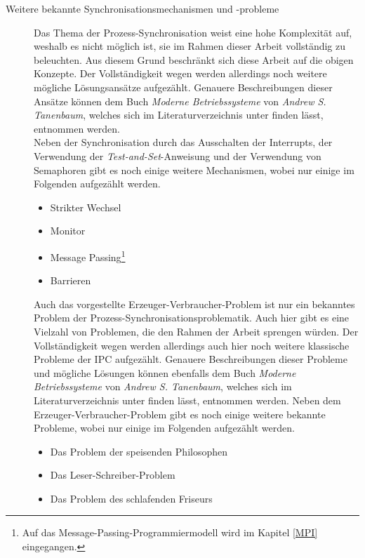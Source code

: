 \begin{description}
					\item[Weitere bekannte Synchronisationsmechanismen und -probleme]
					
						Das Thema der Prozess-Synchronisation weist eine hohe Komplexität auf, weshalb es nicht möglich ist, sie im Rahmen dieser Arbeit vollständig zu beleuchten. Aus diesem Grund beschränkt sich diese Arbeit auf die obigen Konzepte. Der Vollständigkeit wegen werden allerdings noch weitere mögliche Lösungsansätze aufgezählt. Genauere Beschreibungen dieser Ansätze können dem Buch \textit{Moderne Betriebssysteme} von \textit{Andrew S. Tanenbaum}, welches sich im Literaturverzeichnis unter \cite{ModerneBetriebssysteme} finden lässt, entnommen werden.\\
						Neben der Synchronisation durch das Ausschalten der Interrupts, der Verwendung der \textit{Test-and-Set}-Anweisung und der Verwendung von Semaphoren gibt es noch einige weitere Mechanismen, wobei nur einige im Folgenden aufgezählt werden. \cite{ModerneBetriebssysteme}
						
						\begin{itemize}
							\item Strikter Wechsel
							\item Monitor
							\item Message Passing\footnote{Auf das Message-Passing-Programmiermodell wird im Kapitel \ref{MPI} eingegangen.}
							\item Barrieren \cite{ModerneBetriebssysteme}
						\end{itemize}
					
						Auch das vorgestellte Erzeuger-Verbraucher-Problem ist nur ein bekanntes Problem der Prozess-Synchronisationsproblematik. Auch hier gibt es eine Vielzahl von Problemen, die den Rahmen der Arbeit sprengen würden. Der Vollständigkeit wegen werden allerdings auch hier noch weitere klassische Probleme der IPC aufgezählt. Genauere Beschreibungen dieser Probleme und mögliche Lösungen können ebenfalls dem Buch \textit{Moderne Betriebssysteme} von \textit{Andrew S. Tanenbaum}, welches sich im Literaturverzeichnis unter \cite{ModerneBetriebssysteme} finden lässt, entnommen werden.
						Neben dem Erzeuger-Verbraucher-Problem gibt es noch einige weitere bekannte Probleme, wobei nur einige im Folgenden aufgezählt werden. \cite{ModerneBetriebssysteme}
						
						\begin{itemize}
							\item Das Problem der speisenden Philosophen
							\item Das Leser-Schreiber-Problem
							\item Das Problem des schlafenden Friseurs \cite{ModerneBetriebssysteme}
						\end{itemize}
				\end{description}
			
